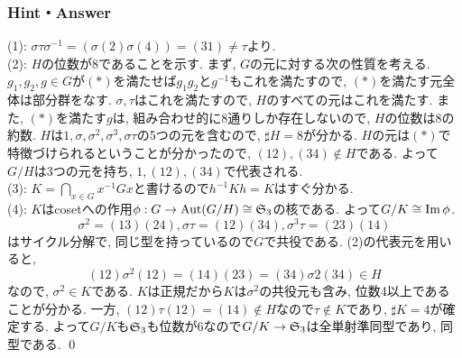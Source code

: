 \subsubsection{Hint・Answer}
{\small
\begin{probans}
(1): $\sigma\tau \sigma^{-1} = (\sigma(2)\sigma(4)) = (31)\neq \tau$より. \\
(2): $H$の位数が8であることを示す. まず, $G$の元に対する次の性質を考える.
$g_1,g_2,g\in G$が$(\ast)$を満たせば$g_1g_2$と$g^{-1}$もこれを満たすので, $(\ast)$を満たす元全体は部分群をなす. $\sigma,\tau$はこれを満たすので, $H$のすべての元はこれを満たす. また, $(\ast)$を満たす$g$は, 組み合わせ的に8通りしか存在しないので, $H$の位数は8の約数. $H$は$1,\sigma,\sigma^2,\sigma^3,\sigma\tau$の5つの元を含むので, $\sharp{H}=8$が分かる. $H$の元は$(\ast)$で特徴づけられるということが分かったので, $(12),(34)\notin H$である.
よって$G/H$は3つの元を持ち, $1,(12),(34)$で代表される. \\
(3): $K=\bigcap_{x\in G}x^{-1}Gx$と書けるので$h^{-1}Kh = K$はすぐ分かる. \\
(4): $K$はcosetへの作用$\phi:G\to \mathrm{Aut}(G/H) \cong \mathfrak{S}_{3}$の核である. よって$G/K\cong \mathrm{Im}\,\phi$.
\[\sigma^2 = (13)(24), \sigma\tau = (12)(34), \sigma^3\tau = (23)(14)\]
はサイクル分解で, 同じ型を持っているので$G$で共役である. (2)の代表元を用いると,
\[(12)\sigma^2(12) = (14)(23) = (34)\sigma2(34) \in H\]
なので, $\sigma^2 \in K$である. $K$は正規だから$K$は$\sigma^2$の共役元も含み, 位数4以上であることが分かる. 一方, $(12)\tau(12) = (14)\notin H$なので$\tau\notin K$であり, $\sharp{K} = 4$が確定する. よって$G/K$も$\mathfrak{S}_{3}$も位数が6なので$G/K\to \mathfrak{S}_{3}$は全単射準同型であり, 同型である. \qed
\end{probans}

}



\newpage
